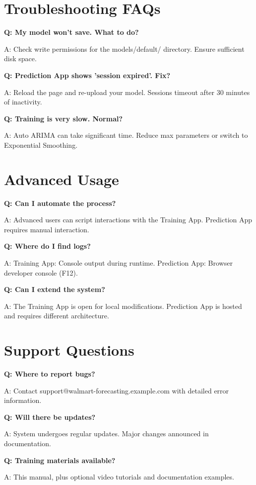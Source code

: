 \section{Troubleshooting FAQs}

\textbf{Q: My model won't save. What to do?}

A: Check write permissions for the models/default/ directory. Ensure sufficient disk space.

\textbf{Q: Prediction App shows 'session expired'. Fix?}

A: Reload the page and re-upload your model. Sessions timeout after 30 minutes of inactivity.

\textbf{Q: Training is very slow. Normal?}

A: Auto ARIMA can take significant time. Reduce max parameters or switch to Exponential Smoothing.

\section{Advanced Usage}

\textbf{Q: Can I automate the process?}

A: Advanced users can script interactions with the Training App. Prediction App requires manual interaction.

\textbf{Q: Where do I find logs?}

A: Training App: Console output during runtime. Prediction App: Browser developer console (F12).

\textbf{Q: Can I extend the system?}

A: The Training App is open for local modifications. Prediction App is hosted and requires different architecture.

\section{Support Questions}

\textbf{Q: Where to report bugs?}

A: Contact support@walmart-forecasting.example.com with detailed error information.

\textbf{Q: Will there be updates?}

A: System undergoes regular updates. Major changes announced in documentation.

\textbf{Q: Training materials available?}

A: This manual, plus optional video tutorials and documentation examples.
